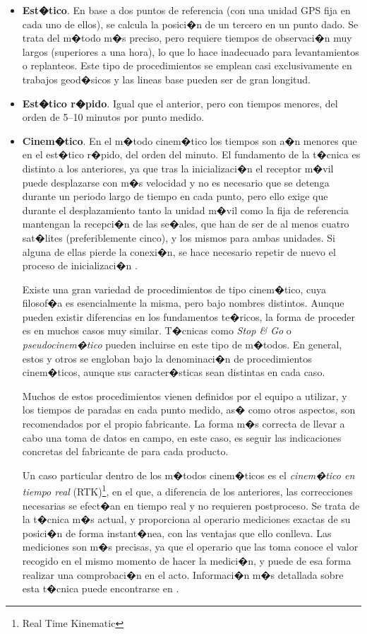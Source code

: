 \begin{itemize}
	\item \textbf{Est�tico}. En base a dos puntos de referencia (con una unidad GPS fija en cada uno de ellos), se calcula la posici�n de un tercero en un punto dado. Se trata del m�todo m�s preciso, pero requiere tiempos de observaci�n muy largos (superiores a una hora), lo que lo hace inadecuado para levantamientos o replanteos. Este tipo de procedimientos se emplean casi exclusivamente en trabajos geod�sicos y las lineas base pueden ser de gran longitud. 
	\item \textbf{Est�tico r�pido}. Igual que el anterior, pero con tiempos menores, del orden de 5--10 minutos por punto medido.	
	\item \textbf{Cinem�tico}. En el m�todo cinem�tico los tiempos son a�n menores que en el est�tico r�pido, del orden del minuto. El fundamento de la t�cnica es distinto a los anteriores, ya que tras la inicializaci�n el receptor m�vil puede desplazarse con m�s velocidad y no es necesario que se detenga durante un periodo largo de tiempo en cada punto, pero ello exige que durante el desplazamiento tanto la unidad m�vil como la fija de referencia mantengan la recepci�n de las se�ales, que han de ser de al menos cuatro sat�lites (preferiblemente cinco), y los mismos para ambas unidades. Si alguna de ellas pierde la conexi�n, se hace necesario repetir de nuevo el proceso de inicializaci�n \cite{Remondi1988IN}.
	
	Existe una gran variedad de procedimientos de tipo cinem�tico, cuya filosof�a es esencialmente la misma, pero bajo nombres distintos. Aunque pueden existir diferencias en los fundamentos te�ricos, la forma de proceder es en muchos casos muy similar. T�cnicas como \emph{Stop \& Go} o \emph{pseudocinem�tico} pueden incluirse en este tipo de m�todos. En general, estos y otros se engloban bajo la denominaci�n de procedimientos cinem�ticos, aunque sus caracter�sticas sean distintas en cada caso. 
	
	Muchos de estos procedimientos vienen definidos por el equipo a utilizar, y los tiempos de paradas en cada punto medido, as� como otros aspectos, son recomendados por el propio fabricante. La forma m�s correcta de llevar a cabo una toma de datos en campo, en este caso, es seguir las indicaciones concretas del fabricante de para cada producto.
	
	Un caso particular dentro de los m�todos cinem�ticos es el \emph{cinem�tico en tiempo real} (RTK)\footnote{Real Time Kinematic}, en el que, a diferencia de los anteriores, las correcciones necesarias se efect�an en tiempo real y no requieren postproceso. Se trata de la t�cnica m�s actual, y proporciona al operario mediciones exactas de su posici�n de forma instant�nea, con las ventajas que ello conlleva. Las mediciones son m�s precisas, ya que el operario que las toma conoce el valor recogido en el mismo momento de hacer la medici�n, y puede de esa forma realizar una comprobaci�n en el acto. Informaci�n m�s detallada sobre esta t�cnica puede encontrarse en \cite{Rizos1998BCG}.
\end{itemize}

